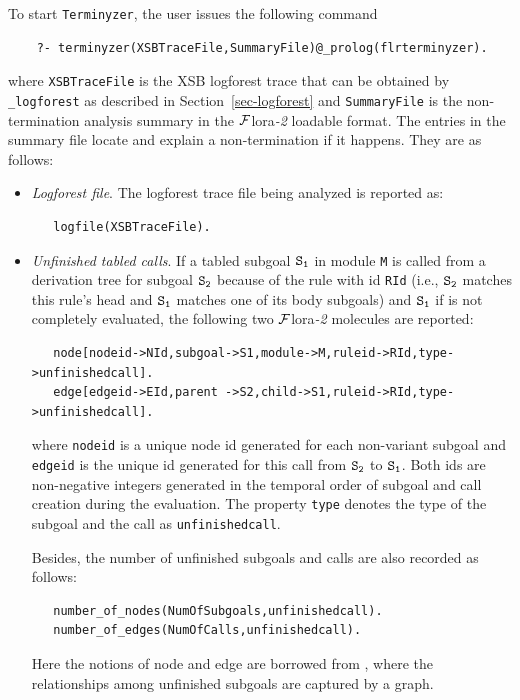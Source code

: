 \documentclass[11pt]{article}
\newcommand{\FLORA}{{\mbox{\sc ${\cal F}${lora}\rm\emph{-2}}}\xspace}
\begin{document}
To start \texttt{Terminyzer}, the user issues the following command
\begin{verbatim}
    ?- terminyzer(XSBTraceFile,SummaryFile)@_prolog(flrterminyzer).
\end{verbatim}
where {\tt XSBTraceFile} is the XSB logforest trace that can be
obtained by {\tt \_logforest} as described in
Section~\ref{sec-logforest} and {\tt SummaryFile} is the non-termination analysis
summary in the \FLORA loadable format.  
The entries in the summary file locate and explain a non-termination
if it happens. They are as follows:
\begin{itemize}
\item \emph{Logforest file}. The logforest trace file being analyzed
  is reported as:
\begin{verbatim}
   logfile(XSBTraceFile).
\end{verbatim}

\item \emph{Unfinished tabled calls}.
  If a tabled subgoal $\tt S_1$ in module {\tt M} is called from a
  derivation tree for subgoal $\tt S_2$ because of the rule with id
  {\tt RId} (i.e., $\tt S_2$ matches this rule's head and $\tt S_1$
  matches one of its body subgoals) and $\tt S_1$ if is not completely
  evaluated, the
  following two \FLORA molecules are reported: 
\begin{verbatim}
   node[nodeid->NId,subgoal->S1,module->M,ruleid->RId,type->unfinishedcall].
   edge[edgeid->EId,parent ->S2,child->S1,ruleid->RId,type->unfinishedcall].
\end{verbatim}
  where {\tt nodeid} is a unique node id generated for each
  non-variant subgoal and 
  {\tt edgeid} is the unique id generated for this call from $\tt S_2$
  to $\tt S_1$. 
  Both ids are non-negative integers generated in the
  temporal order of subgoal and call creation during the evaluation.
  The property
  {\tt type} denotes the type of the subgoal and the call as {\tt unfinishedcall}.

  Besides, the number of unfinished subgoals and calls are also
  recorded as follows:
\begin{verbatim}
   number_of_nodes(NumOfSubgoals,unfinishedcall).
   number_of_edges(NumOfCalls,unfinishedcall).
\end{verbatim}
  Here the notions of node and edge are borrowed from
  \cite{terminyzer}, where the relationships among unfinished subgoals
  are captured by a graph. 


\end{itemize}
\end{document}
